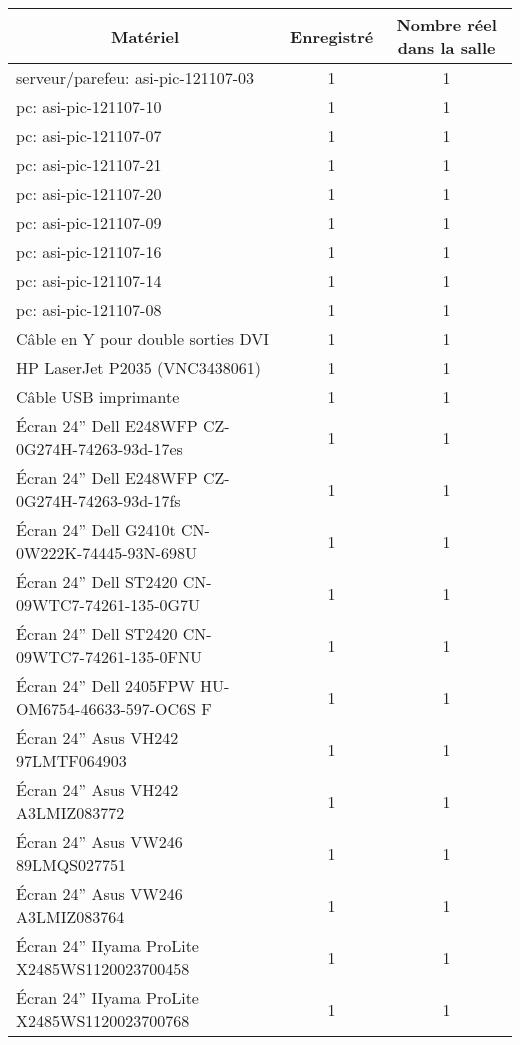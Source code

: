 \begin{center}
\begin{longtable}{|p{10cm}|c|c|}
\hline \multicolumn{1}{|c|}{\textbf{Matériel}} & \multicolumn{1}{c|}{\textbf{Enregistré}} & \multicolumn{1}{c|}{\textbf{Nombre réel dans la salle}} \\ \hline 
\endfirsthead

		\hline serveur/parefeu: asi-pic-121107-03  & 1 & 1 \\
		\hline pc: asi-pic-121107-10 & 1 & 1 \\
		\hline pc: asi-pic-121107-07 & 1 & 1 \\
		\hline pc: asi-pic-121107-21 & 1 & 1 \\
		\hline pc: asi-pic-121107-20 & 1 & 1 \\
		\hline pc: asi-pic-121107-09 & 1 & 1 \\
		\hline pc: asi-pic-121107-16 & 1 & 1 \\
		\hline pc: asi-pic-121107-14 & 1 & 1 \\
		\hline pc: asi-pic-121107-08 & 1 & 1 \\
		\hline Câble en Y pour double sorties DVI & 1 & 1 \\ 
		\hline HP LaserJet P2035 (VNC3438061)& 1 & 1 \\ 
		\hline Câble USB imprimante & 1 & 1 \\ 
		\hline Écran 24” Dell E248WFP CZ-0G274H-74263-93d-17es & 1 & 1 \\ 
		\hline Écran 24” Dell E248WFP CZ-0G274H-74263-93d-17fs & 1 & 1 \\ 
		\hline Écran 24” Dell G2410t CN-0W222K-74445-93N-698U & 1 & 1 \\ 
		\hline Écran 24” Dell ST2420 CN-09WTC7-74261-135-0G7U & 1 & 1 \\ 
		\hline Écran 24” Dell ST2420 CN-09WTC7-74261-135-0FNU & 1 & 1 \\ 
		\hline Écran 24” Dell 2405FPW HU-OM6754-46633-597-OC6S F  & 1 & 1 \\ 
		\hline Écran 24” Asus VH242 97LMTF064903 & 1 & 1 \\ 
		\hline Écran 24” Asus VH242 A3LMIZ083772 & 1 & 1 \\ 
		\hline Écran 24” Asus VW246 89LMQS027751 & 1 & 1 \\
		\hline Écran 24” Asus VW246 A3LMIZ083764 & 1 & 1 \\	
		\hline Écran 24” IIyama ProLite X2485WS1120023700458 & 1 & 1 \\ 
		\hline Écran 24” IIyama ProLite X2485WS1120023700768 & 1 & 1 \\

\end{longtable}
\end{center}
